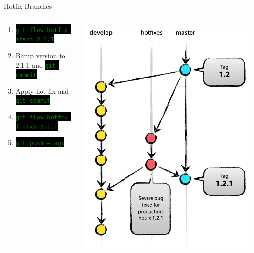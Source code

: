 \documentclass[
14pt,
aspectratio=169,
usenames,
dvipsnames,
x11names]{beamer}
\newcommand{\code}[1]{{\small\colorbox{black}{\textcolor{green}{\texttt{#1}}}}}
\begin{document}
\begin{frame}{Hotfix Branches}
  \begin{columns}
    \begin{column}{.65\linewidth}
      \minipage[c][0.75\textheight][s]{\columnwidth}
      \begin{enumerate} \setlength{\itemsep}{\fill}
      \item \code{git flow hotfix start 2.1.1}
      \item Bump version to 2.1.1 and \code{git commit}
      \item Apply hot fix and \code{git commit}
      \item \code{git flow hotfix finish 2.1.1}
      \item \code{git push --tags}
      \end{enumerate}
      \endminipage
    \end{column}
    \begin{column}{.35\linewidth}
      \centering
      \includegraphics[width=.8\textwidth]{hotfix-branches}
    \end{column}
  \end{columns}
\end{frame}
\end{document}
